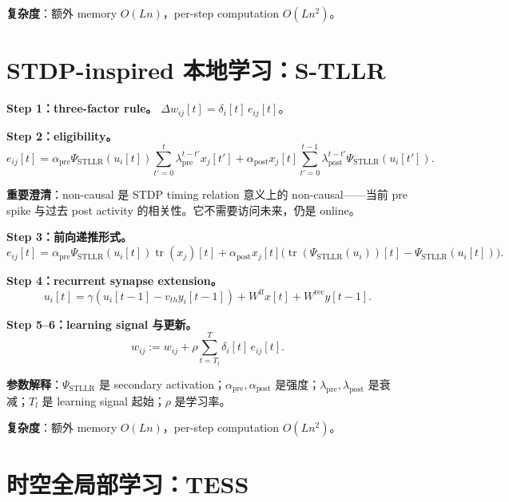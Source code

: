 \documentclass[journal,12pt,onecolumn]{IEEEtran}
\begin{document}
\textbf{复杂度}：额外 memory $O(Ln)$，per-step computation $O(Ln^2)$。

\section{STDP-inspired 本地学习：S-TLLR}

\textbf{Step 1：three-factor rule。} $\Delta w_{ij}[t]=\delta_i[t]\,e_{ij}[t]$。

\textbf{Step 2：eligibility。}
\begin{equation}
e_{ij}[t]
=
\alpha_{\mathrm{pre}}\Psi_{\mathrm{STLLR}}(u_i[t])\sum_{t'=0}^{t}\lambda_{\mathrm{pre}}^{t-t'}x_j[t']
+
\alpha_{\mathrm{post}}x_j[t]\sum_{t'=0}^{t-1}\lambda_{\mathrm{post}}^{t-t'}\Psi_{\mathrm{STLLR}}(u_i[t']).
\end{equation}

\textbf{重要澄清}：non-causal 是 STDP timing relation 意义上的 non-causal——当前 pre spike 与过去 post activity 的相关性。它不需要访问未来，仍是 online。

\textbf{Step 3：前向递推形式。}
\begin{equation}
e_{ij}[t]=\alpha_{\mathrm{pre}}\Psi_{\mathrm{STLLR}}(u_i[t])\operatorname{tr}(x_j)[t]+\alpha_{\mathrm{post}}x_j[t]\big(\operatorname{tr}(\Psi_{\mathrm{STLLR}}(u_i))[t]-\Psi_{\mathrm{STLLR}}(u_i[t])\big).
\end{equation}

\textbf{Step 4：recurrent synapse extension。}
\begin{equation}
u_i[t]=\gamma(u_i[t-1]-v_{th}y_i[t-1])+W^{\mathrm{ff}}x[t]+W^{\mathrm{rec}}y[t-1].
\end{equation}

\textbf{Step 5--6：learning signal 与更新。}
\begin{equation}
w_{ij}:=w_{ij}+\rho\sum_{t=T_l}^{T}\delta_i[t]\,e_{ij}[t].
\end{equation}

\textbf{参数解释}：$\Psi_{\mathrm{STLLR}}$ 是 secondary activation；$\alpha_{\mathrm{pre}},\alpha_{\mathrm{post}}$ 是强度；$\lambda_{\mathrm{pre}},\lambda_{\mathrm{post}}$ 是衰减；$T_l$ 是 learning signal 起始；$\rho$ 是学习率。

\textbf{复杂度}：额外 memory $O(Ln)$，per-step computation $O(Ln^2)$。

\section{时空全局部学习：TESS}
\end{document}
